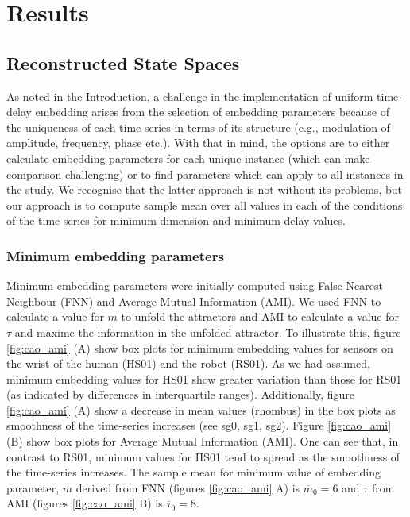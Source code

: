 \documentclass[fleqn,10pt]{wlscirep}
\begin{document}
\section*{Results}

\subsection*{Reconstructed State Spaces}
As noted in the Introduction, a challenge in the implementation of uniform time-delay embedding arises from the selection of embedding parameters because of the uniqueness of each time series in terms of its structure (e.g., modulation of amplitude, frequency, phase etc.).
With that in mind, the options are to either calculate embedding parameters for each unique instance (which can make comparison challenging) or to find parameters which can apply to all instances in the study.
We recognise that the latter approach is not without its problems, but our approach is to compute sample mean over all values in each of the conditions of the time series for minimum dimension and minimum delay values.

\subsubsection*{Minimum embedding parameters}
Minimum embedding parameters were initially computed using False Nearest Neighbour (FNN) and Average Mutual Information (AMI).   We used FNN to calculate a value for $m$ to unfold the attractors and AMI to calculate a value for $\tau$ and maxime the information in the unfolded attractor.
To illustrate this, figure \ref{fig:cao_ami} (A) show box plots for minimum embedding values for sensors on the wrist of the human (HS01) and the robot (RS01).
As we had assumed, minimum embedding values for HS01 show greater variation than those for RS01 (as indicated by differences in interquartile ranges).
Additionally, figure \ref{fig:cao_ami} (A) show a decrease in mean values (rhombus) in the box plots as smoothness of the time-series increases (see sg0, sg1, sg2).
Figure \ref{fig:cao_ami} (B) show box plots for Average Mutual Information (AMI).
One can see that, in contrast to RS01, minimum values for HS01 tend to spread as the smoothness of the time-series increases.
The sample mean for minimum value of embedding parameter, $m$ derived from FNN  (figures \ref{fig:cao_ami} A) is $\overline{m}_0=6$ and $\tau$ from AMI (figures \ref{fig:cao_ami} B) is $\overline{\tau}_0=8$.
\end{document}
